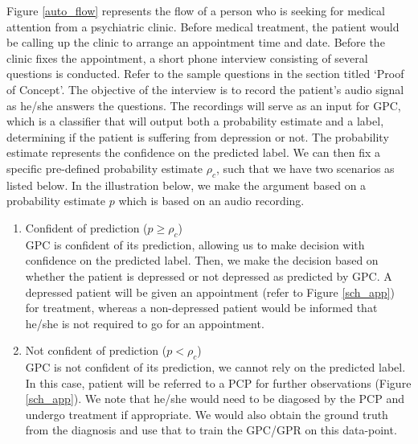 \documentclass{article}
\begin{document}
Figure \ref{auto_flow} represents the flow of a person who is seeking for medical attention from a psychiatric clinic.
    Before medical treatment, the patient would be calling up the clinic to arrange an appointment time and date. 
    Before the clinic fixes the appointment, a short phone interview consisting of several questions is conducted.
    Refer to the sample questions in the section titled `Proof of Concept'.
    The objective of the interview is to record the patient's audio signal as he/she answers the questions.
    The recordings will serve as an input for GPC, which is a classifier that will output both a probability estimate and a label, determining if the patient is suffering from depression or not.
    The probability estimate represents the confidence on the predicted label. 
    We can then fix a specific pre-defined probability estimate $\rho_c$, such that we have two scenarios as listed below. 
    In the illustration below, we make the argument based on a probability estimate $p$ which is based on an audio recording.
	
	\begin{enumerate}
		\item {Confident of prediction ($p \geq \rho_c$)} \\
		GPC is confident of its prediction, allowing us to make decision with confidence on the predicted label.
		Then, we make the decision based on whether the patient is depressed or not depressed as predicted by GPC. 
		A depressed patient will be given an appointment (refer to Figure \ref{sch_app}) for treatment, whereas a non-depressed patient would be informed that he/she is not required to go for an appointment.
		\item {Not confident of prediction ($p < \rho_c$}) \\
		GPC is not confident of its prediction, we cannot rely on the predicted label. 
		In this case, patient will be referred to a PCP for further observations (Figure \ref{sch_app}). 
		We note that he/she would need to be diagosed by the PCP and undergo treatment if appropriate. 
		We would also obtain the ground truth from the diagnosis and use that to train the GPC/GPR on this data-point. 
	\end{enumerate}
	
\end{document}
